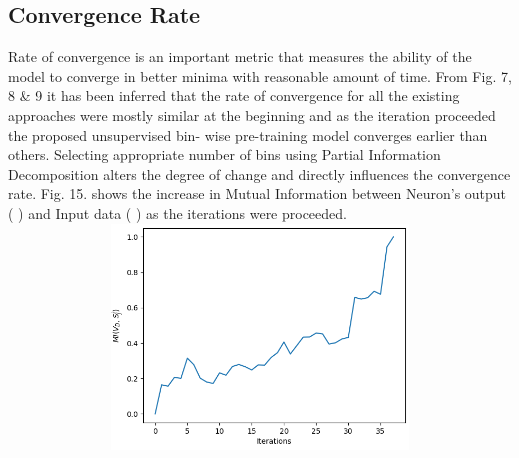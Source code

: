 \documentclass{article}
\begin{document}
\subsection{Convergence Rate}
Rate of convergence is an important metric that measures the ability of the model to
converge in better minima with reasonable amount of time. From Fig. 7, 8 \& 9 it has
been inferred that the rate of convergence for all the existing approaches were mostly
similar at the beginning and as the iteration proceeded the proposed unsupervised bin-
wise pre-training model converges earlier than others. Selecting appropriate number of
bins using Partial Information Decomposition alters the degree of change and directly
influences the convergence rate. Fig. 15. shows the increase in Mutual Information
between Neuron’s output ( ) and Input data ( ) as the iterations were proceeded.
\includegraphics[width=14cm, height=6cm]{fig15}
\end{document}
